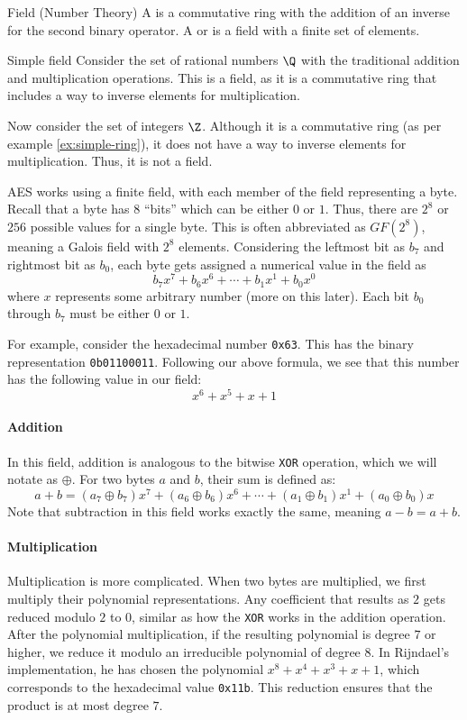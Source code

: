 \begin{dfnbox}{Field (Number Theory)}{}
    A  is a commutative ring with the addition of an inverse for the second binary operator. A  or  is a field with a finite set of elements.
\end{dfnbox}

\begin{exbox}{Simple field}{}
    Consider the set of rational numbers $\Q$ with the traditional addition and multiplication operations. This is a field, as it is a commutative ring that includes a way to inverse elements for multiplication.

    Now consider the set of integers $\Z$. Although it is a commutative ring (as per example \ref{ex:simple-ring}), it does not have a way to inverse elements for multiplication. Thus, it is not a field.
\end{exbox}

AES works using a finite field, with each member of the field representing a byte. Recall that a byte has 8 ``bits'' which can be either $0$ or $1$. Thus, there are $2^8$ or $256$ possible values for a single byte. This is often abbreviated as $GF(2^8)$, meaning a Galois field with $2^8$ elements. Considering the leftmost bit as $b_7$ and rightmost bit as $b_0$, each byte gets assigned a numerical value in the field as
\[ b_7 x^7 + b_6 x^6 + \cdots + b_1 x^1 + b_0 x^0 \]
where $x$ represents some arbitrary number (more on this later). Each bit $b_0$ through $b_7$ must be either $0$ or $1$.

For example, consider the hexadecimal number \texttt{0x63}. This has the binary representation \texttt{0b01100011}. Following our above formula, we see that this number has the following value in our field:
\[ x^6 + x^5 + x + 1 \]

\paragraph{Addition}
In this field, addition is analogous to the bitwise \texttt{XOR} operation, which we will notate as $\oplus$. For two bytes $a$ and $b$, their sum is defined as:
\[ a + b = (a_7 \oplus b_7)x^7 + (a_6 \oplus b_6)x^6 + \cdots + (a_1 \oplus b_1) x^1 + (a_0 \oplus b_0) x \]
Note that subtraction in this field works exactly the same, meaning $a - b = a + b$.

\paragraph{Multiplication}
Multiplication is more complicated. When two bytes are multiplied, we first multiply their polynomial representations. Any coefficient that results as $2$ gets reduced modulo $2$ to $0$, similar as how the \texttt{XOR} works in the addition operation. After the polynomial multiplication, if the resulting polynomial is degree $7$ or higher, we reduce it modulo an irreducible polynomial of degree $8$. In Rijndael's implementation, he has chosen the polynomial $x^8 + x^4 + x^3 + x + 1$, which corresponds to the hexadecimal value \texttt{0x11b}. This reduction ensures that the product is at most degree $7$.

